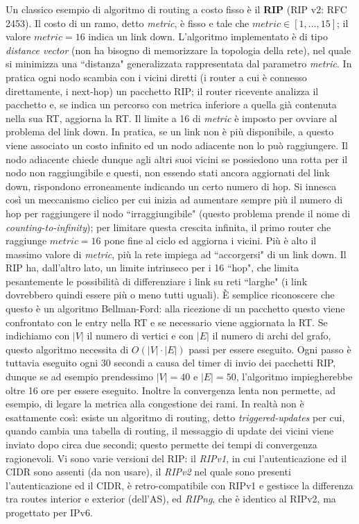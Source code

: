 Un classico esempio di algoritmo di routing a costo fisso è il \textbf{RIP} (RIP v2: RFC 2453). Il costo di un ramo, detto \textit{metric}, è fisso e tale che $metric \in [1, \dots, 15]$; il valore $metric = 16$ indica un link down. L'algoritmo implementato è di tipo \textit{distance vector} (non ha bisogno di memorizzare la topologia della rete), nel quale si minimizza una \textquotedblleft distanza" generalizzata rappresentata dal parametro \textit{metric}. In pratica ogni nodo scambia con i vicini diretti (i router a cui è connesso direttamente, i next-hop) un pacchetto RIP; il router ricevente analizza il pacchetto e, se indica un percorso con metrica inferiore a quella già contenuta nella sua RT, aggiorna la RT. Il limite a 16 di \textit{metric} è imposto per ovviare al problema del link down. In pratica, se un link non è più disponibile, a questo viene associato un costo infinito ed un nodo adiacente non lo può raggiungere. Il nodo adiacente chiede dunque agli altri suoi vicini se possiedono una rotta per il nodo non raggiungibile e questi, non essendo stati ancora aggiornati del link down, rispondono erroneamente indicando un certo numero di hop. Si innesca così un meccanismo ciclico per cui inizia ad aumentare sempre più il numero di hop per raggiungere il nodo \textquotedblleft irraggiungibile" (questo problema prende il nome di \textit{counting-to-infinity}); per limitare questa crescita infinita, il primo router che raggiunge $metric = 16$ pone fine al ciclo ed aggiorna i vicini. Più è alto il massimo valore di \textit{metric}, più la rete impiega ad \textquotedblleft accorgersi" di un link down. Il RIP ha, dall'altro lato, un limite intrinseco per i 16 \textquotedblleft hop", che limita pesantemente le possibilità di differenziare i link su reti \textquotedblleft larghe" (i link dovrebbero quindi essere più o meno tutti uguali). È semplice riconoscere che questo è un algoritmo Bellman-Ford: alla ricezione di un pacchetto questo viene confrontato con le entry nella RT e se necessario viene aggiornata la RT. Se indichiamo con $|V|$ il numero di vertici e con $|E|$ il numero di archi del grafo, questo algoritmo necessita di $O(|V|\cdot|E|)$ passi per essere eseguito. Ogni passo è tuttavia eseguito ogni 30 secondi a causa del timer di invio dei pacchetti RIP, dunque se ad esempio prendessimo $|V|=40$ e $|E|=50$, l'algoritmo impiegherebbe oltre 16 ore per essere eseguito. Inoltre la convergenza lenta non permette, ad esempio, di legare la metrica alla congestione dei rami. In realtà non è esattamente così: esiste un algoritmo di routing, detto \textit{triggered-updates} per cui, quando cambia una tabella di routing, il messaggio di update dei vicini viene inviato dopo circa due secondi; questo permette dei tempi di convergenza ragionevoli. Vi sono varie versioni del RIP: il \textit{RIPv1}, in cui l'autenticazione ed il CIDR sono assenti (da non usare), il \textit{RIPv2} nel quale sono presenti l'autenticazione ed il CIDR, è retro-compatibile con RIPv1 e gestisce la differenza tra routes interior e exterior (dell'AS), ed \textit{RIPng}, che è identico al RIPv2, ma progettato per IPv6.\\
